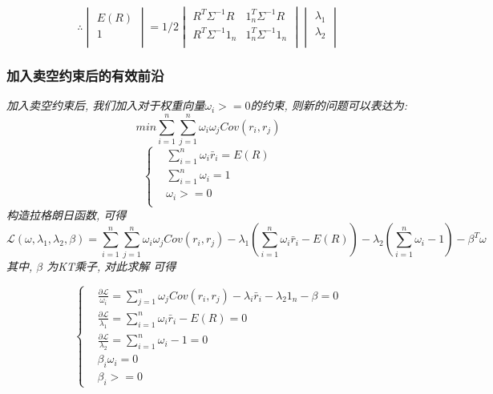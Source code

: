 \documentclass{scrartcl}
\numberwithin{equation}{section}
\begin{document}
\[\therefore
    \begin{vmatrix}
        E(R) \\ 1\\
    \end{vmatrix} = 1/2 \begin{vmatrix}
        R^T \Sigma^{-1} R & 1_n^T \Sigma^{-1} R \\ R^T \Sigma^{-1} 1_n & 1_n^T \Sigma^{-1} 1_n\\
    \end{vmatrix} \begin{vmatrix}
        \lambda_1 \\ \lambda_2 \\
    \end{vmatrix}
\]


\subsubsection{加入卖空约束后的有效前沿}
\textsl{加入卖空约束后, 我们加入对于权重向量$\omega_i >=0$的约束, 则新的问题可以表达为:}
$$ min \sum_{i=1}^n \sum_{j=1}^n \omega_i \omega_j Cov(r_i, r_j)$$
\begin{equation}
    \left\{
    \begin{array}{lr}
         & \sum_{i=1}^n \omega_i \bar{r}_i = E(R) \\
         & \sum_{i=1}^n \omega_i =1               \\
         & \omega_i  >=0                          \\
    \end{array}
    \right.
\end{equation}
\textsl{
    构造拉格朗日函数, 可得
}
$$\mathcal{L} (\omega, \lambda_1, \lambda_2, \beta) = \sum_{i=1}^n \sum_{j=1}^n \omega_i \omega_j Cov(r_i, r_j) - \lambda_1(\sum_{i=1}^n \omega_i \bar{r}_i - E(R)) - \lambda_2 (\sum_{i=1}^n \omega_i -1) - \beta^T \omega$$
\textsl{其中, $\beta$ 为KT乘子, 对此求解 可得}

\begin{equation}
    \left\{
    \begin{array}{lr}
         & \frac{\partial \mathcal{L}}{\omega_i} = \sum_{j=1}^n \omega_j Cov(r_i, r_j) - \lambda_i \bar{r}_i - \lambda_2  1_n - \beta =0 \\ & \frac{\partial \mathcal{L}}{\lambda_1} = \sum_{i=1}^n \omega_i \bar{r}_i - E(R) =0 \\ & \frac{\partial \mathcal{L}}{\lambda_2} = \sum_{i=1}^n \omega_i -1 =0 \\ & \beta_i \omega_i =0 \\ & \beta_i >=0
    \end{array}
    \right.
\end{equation}
\newpage
\end{document}
